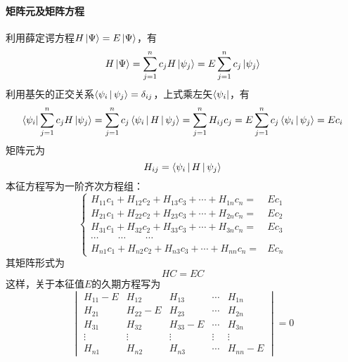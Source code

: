 \paragraph*{矩阵元及矩阵方程}
利用薛定谔方程$H\ket{\Psi} = E\ket{\Psi}$，有
\begin{equation}
    H\ket{\Psi} = \sum_{j=1}^{n}c_j H\ket{\psi_j} = E\sum_{j=1}^{n} c_j\ket{\psi_j}
\end{equation}
利用基矢的正交关系$\Braket{\psi_i | \psi_j} = \delta_{ij}$，上式乘左矢$\bra{\psi_i}$，有
\begin{equation}
    \bra{\psi_i}\sum_{j=1}^{n}c_j H\ket{\psi_j}
    =\sum_{j=1}^{n}c_j \Braket{\psi_i|H|\psi_j}
    =\sum_{j=1}^{n} H_{ij} c_j 
    =E\sum_{j=1}^{n} c_j\Braket{\psi_i|\psi_j}
    = E c_i
    \label{eq:basis-expand-eq}
\end{equation}
矩阵元为
\begin{equation}
    H_{ij} = \Braket{\psi_i | H | \psi_j}
\end{equation}
本征方程写为一阶齐次方程组：
\begin{equation}
    \left\{
        \begin{aligned}
            H_{11}c_1 + H_{12}c_2 + H_{13}c_3 + \cdots + H_{1n}c_n =& E c_1 \\
            H_{21}c_1 + H_{22}c_2 + H_{23}c_3 + \cdots + H_{2n}c_n =& E c_2 \\
            H_{31}c_1 + H_{32}c_2 + H_{33}c_3 + \cdots + H_{3n}c_n =& E c_3 \\           
            \cdots \qquad \cdots \qquad \cdots \\
            H_{n1}c_1 + H_{n2}c_2 + H_{n3}c_3 + \cdots + H_{nn}c_n =& E c_n    
        \end{aligned}         
    \right. 
    \label{eq:expand-coeff}
\end{equation}
其矩阵形式为
\begin{equation}
    HC = EC
    \label{eq:expand-basis-matform}
\end{equation}
这样，关于本征值$E$的久期方程写为
\begin{equation}
    \begin{vmatrix}
        H_{11} - E  &  H_{12}  &  H_{13}  & \cdots  &  H_{1n} \\
        H_{21}  &  H_{22} - E  &  H_{23}  & \cdots  &  H_{2n} \\
        H_{31}  &  H_{32}  &  H_{33} - E  & \cdots  &  H_{3n} \\
        \vdots  &  \vdots  &  \vdots      & \vdots  &  \vdots \\
        H_{n1}  &  H_{n2}  &  H_{n3}  & \cdots  &  H_{nn} - E
    \end{vmatrix}
    = 0
\end{equation}
